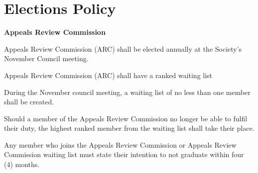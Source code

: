 \section{Elections Policy}
\begin{longenum}[ label*=\thesection.\arabic*., align=left]
 \item \textbf{Appeals Review Commission}
 \begin{longenum}[label*=\arabic*., align=left]
  \item Appeals Review Commission (ARC) shall be elected annually at the Society's November Council meeting.
  \item Appeals Review Commission (ARC) shall have a ranked waiting list
  \begin{longenum}[label*=\arabic*., align=left]
  	\item  During the November council meeting, a waiting list of no less than one member shall be created.
  	\item Should a member of the Appeals Review Commission no longer be able to fulfil their duty, the highest ranked member from the waiting list shall take their place.
  \end{longenum}
  \item Any member who joins the Appeals Review Commission or Appeals Review Commission waiting list must state their intention to not graduate within four (4) months.
  \end{longenum}


\end{longenum}
